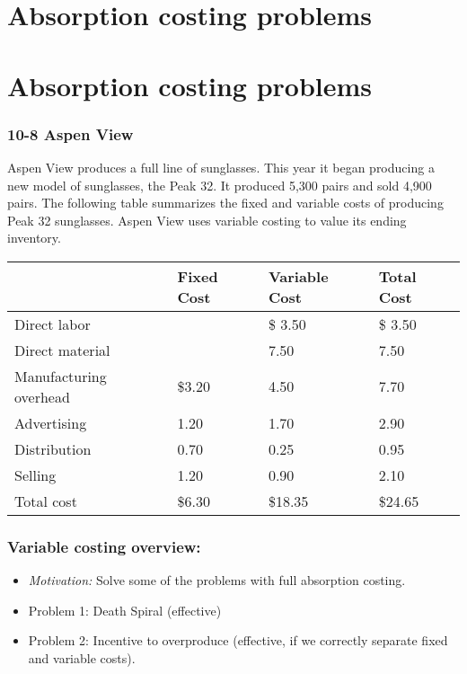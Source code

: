 \hypertarget{title-slide}{}
\hypertarget{absorption-costing-problems}{%
\section{Absorption costing
problems}\label{absorption-costing-problems}}

\hypertarget{title-slide}{}
\hypertarget{absorption-costing-problems}{}
\hypertarget{absorption-costing-problems-1}{%
\section{Absorption costing
problems}\label{absorption-costing-problems-1}}

\hypertarget{aspen-view}{%
\subsubsection{10-8 Aspen View}\label{aspen-view}}

Aspen View produces a full line of sunglasses. This year it began
producing a new model of sunglasses, the Peak 32. It produced 5,300
pairs and sold 4,900 pairs. The following table summarizes the fixed and
variable costs of producing Peak 32 sunglasses. Aspen View uses variable
costing to value its ending inventory.

\begin{longtable}[]{@{}llll@{}}
\toprule\noalign{}
& Fixed Cost & Variable Cost & Total Cost \\
\midrule\noalign{}
\endhead
\bottomrule\noalign{}
\endlastfoot
Direct labor & & \$ 3.50 & \$ 3.50 \\
Direct material & & 7.50 & 7.50 \\
Manufacturing overhead & \$3.20 & 4.50 & 7.70 \\
Advertising & 1.20 & 1.70 & 2.90 \\
Distribution & 0.70 & 0.25 & 0.95 \\
Selling & 1.20 & 0.90 & 2.10 \\
Total cost & \$6.30 & \$18.35 & \$24.65 \\
\end{longtable}

\hypertarget{variable-costing-overview}{%
\subsubsection{Variable costing
overview:}\label{variable-costing-overview}}

\begin{itemize}
\tightlist
\item
  \emph{Motivation:} Solve some of the problems with full absorption
  costing.
\item
  Problem 1: Death Spiral (effective)
\item
  Problem 2: Incentive to overproduce (effective, if we correctly
  separate fixed and variable costs).
\end{itemize}

